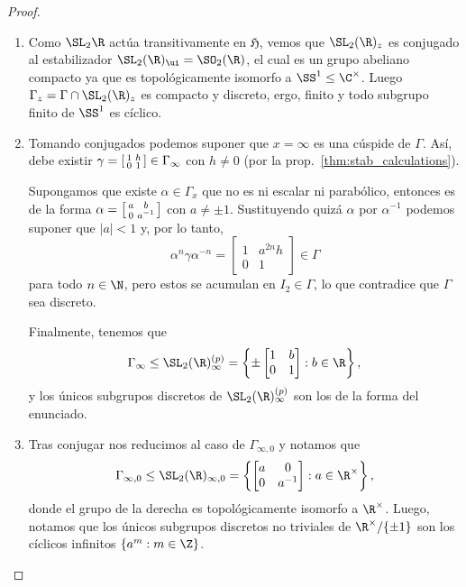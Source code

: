 \documentclass[teoria-numeros.tex]{subfiles}
\begin{document}
\begin{proof}
	\begin{enumerate}
		\item Como $\SL_2\R$ actúa transitivamente en $\mathfrak{H}$,
			vemos que $\SL_2(\R)_z$ es conjugado al estabilizador $\SL_2(\R)_\ui = \SO_2(\R)$, el cual es un grupo abeliano compacto
			ya que es topológicamente isomorfo a $\SS^1 \le \C^\times$.
			Luego $\Gamma_z = \Gamma \cap \SL_2(\R)_z$ es compacto y discreto, ergo, finito y todo subgrupo finito de $\SS^1$ es cíclico.
		\item Tomando conjugados podemos suponer que $x = \infty$ es una cúspide de $\Gamma$.
			Así, debe existir $\gamma =
			\begin{bsmallmatrix}
				1 & h \\
				0 & 1
			\end{bsmallmatrix} \in \Gamma_\infty$ con $h \ne 0$ (por la prop.~\ref{thm:stab_calculations}).

			Supongamos que existe $\alpha \in \Gamma_x$ que no es ni escalar ni parabólico,
			entonces es de la forma $\alpha = 
			\begin{bsmallmatrix}
				a & b \\
				0 & a^{-1}
			\end{bsmallmatrix}$ con $a \ne \pm 1$.
			Sustituyendo quizá $\alpha$ por $\alpha^{-1}$ podemos suponer que $|a| < 1$ y, por lo tanto,
			\[
				\alpha^n \gamma \alpha^{-n} =
				\begin{bmatrix}
					1 & a^{2n}h \\
					0 & 1
				\end{bmatrix} \in \Gamma
			\]
			para todo $n \in \N$, pero estos se acumulan en $I_2 \in \Gamma$, lo que contradice que $\Gamma$ sea discreto.

			Finalmente, tenemos que
			\[
				\Gamma_\infty \le \SL_2(\R)^{(p)}_\infty = \left\{ \pm
					\begin{bmatrix}
						1 & b \\
						0 & 1
					\end{bmatrix} : b \in \R 
				\right\},
			\]
			y los únicos subgrupos discretos de $\SL_2(\R)^{(p)}_\infty$ son los de la forma del enunciado.

		\item Tras conjugar nos reducimos al caso de $\Gamma_{\infty, 0}$ y notamos que
			\[
				\Gamma_{\infty, 0} \le \SL_2(\R)_{\infty, 0} = \left\{
					\begin{bmatrix}
						a & 0 \\
						0 & a^{-1}
					\end{bmatrix} : a \in \R^\times
				\right\},
			\]
			donde el grupo de la derecha es topológicamente isomorfo a $\R^\times$.
			Luego, notamos que los únicos subgrupos discretos no triviales de $\R^\times / \{ \pm 1 \}$ son
			los cíclicos infinitos $\{ a^m : m \in \Z \}$.
			\qedhere
	\end{enumerate}
\end{proof}
\end{document}
